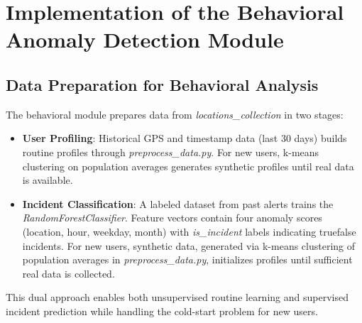 \documentclass[12pt,a4paper,oneside,english]{book}
\begin{document}
\section{Implementation of the Behavioral Anomaly Detection Module} %

\subsection{Data Preparation for Behavioral Analysis}
\label{sec:Data_behav}
The behavioral module prepares data from \textit{locations\_collection} in two stages:
\begin{itemize}
\item \textbf{User Profiling}: Historical GPS and timestamp data (last 30 days) builds routine profiles through \textit{preprocess\_data.py}. For new users, k-means clustering on population averages generates synthetic profiles until real data is available.
\item \textbf{Incident Classification}: A labeled dataset from past alerts trains the \textit{RandomForestClassifier}. Feature vectors contain four anomaly scores (location, hour, weekday, month) with \textit{is\_incident} labels indicating true\/false incidents. For new users, synthetic data, generated via k-means clustering of population averages in \textit{preprocess\_data.py}, initializes profiles until sufficient real data is collected.
\end{itemize}
This dual approach enables both unsupervised routine learning and supervised incident prediction while handling the cold-start problem for new users.
\end{document}
